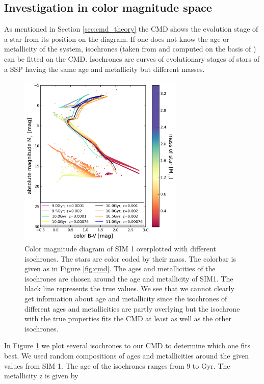 \subsection{Investigation in color magnitude space}\label{sec:cmd_plots}
As mentioned in Section \ref{sec:cmd_theory} the \ac{CMD} shows the evolution stage of a star from its position on the diagram. If one does not know the age or metallicity of the system, isochrones (taken from and computed on the basis of \citealt{2012MNRAS.427..127B}) can be fitted on the \ac{CMD}. Isochrones are curves of evolutionary stages of stars of a \ac{SSP} having the same age and metallicity but different masses. 
\begin{figure}[htbp]
\centering
\includegraphics[width=0.7\textwidth]{Plots/cmd_isochrones.png}
\caption{Color magnitude diagram of SIM 1 overplotted with different isochrones. The stars are color coded by their mass. The colorbar is given as in Figure \ref{fig:cmd}. The ages and metallicities of the isochrones are chosen around the age and metallicity of SIM1. The black line represents the true values. We see that we cannot clearly get information about age and metallicity since the isochrones of different ages and metallicities are partly overlying but the isochrone with the true properties fits the \ac{CMD} at least as well as the other isochrones.}
	\label{fig:cmd_isochrones}
\end{figure}
In Figure \ref{fig:cmd_isochrones} we plot several isochrones to our \ac{CMD} to determine which one fits best. We used random compositions of ages and metallicities around the given values from SIM 1. The age of the isochrones ranges from 9 to \unit[11]{Gyr}. The metallicity z is given by 
